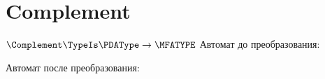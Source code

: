 \section{Complement}
\begin{frame}{$\Complement\TypeIs\PDAType\to\MFATYPE$}
	Автомат до преобразования:

	Автомат после преобразования:

\end{frame}